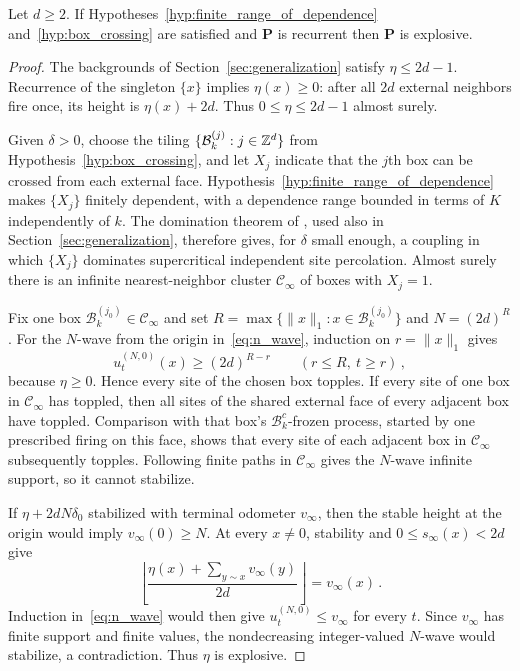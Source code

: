 \documentclass[12pt]{amsart}
\begin{document}
\begin{prop} \label{prop:explosion_criteria}
	Let $d\geq2$. If Hypotheses~\ref{hyp:finite_range_of_dependence} and~\ref{hyp:box_crossing} are satisfied and $\mathbf{P}$ is recurrent then $\mathbf{P}$ is explosive.
\end{prop}

\begin{proof}
The backgrounds of Section~\ref{sec:generalization} satisfy $\eta\leq 2d-1$.
Recurrence of the singleton $\{x\}$ implies $\eta(x)\geq0$: after all
$2d$ external neighbors fire once, its height is $\eta(x)+2d$.
Thus $0\leq\eta\leq2d-1$ almost surely.

Given $\delta>0$, choose the tiling $\{\mathcal B_k^{(j)}:j\in\mathbb{Z}^d\}$ from Hypothesis~\ref{hyp:box_crossing}, and let $X_j$ indicate that the $j$th box can be crossed from each external face. Hypothesis~\ref{hyp:finite_range_of_dependence} makes $\{X_j\}$ finitely dependent, with a dependence range bounded in terms of $K$ independently of $k$. The domination theorem of \cite{liggett1997domination}, used also in Section~\ref{sec:generalization}, therefore gives, for $\delta$ small enough, a coupling in which $\{X_j\}$ dominates supercritical independent site percolation. Almost surely there is an infinite nearest-neighbor cluster $\mathcal C_\infty$ of boxes with $X_j=1$.

Fix one box $\mathcal B_k^{(j_0)}\in\mathcal C_\infty$ and set $R=\max\{\|x\|_1:x\in\mathcal B_k^{(j_0)}\}$ and $N=(2d)^R$.
For the $N$-wave from the origin in~\eqref{eq:n_wave}, induction on $r=\|x\|_1$ gives
\begin{equation*}
u_t^{(N,0)}(x)\geq(2d)^{R-r}\qquad(r\leq R,\ t\geq r)\,,
\end{equation*}
because $\eta\geq0$. Hence every site of the chosen box topples.
If every site of one box in $\mathcal C_\infty$ has toppled, then all sites of the shared external face of every adjacent box have toppled. Comparison with that box's $\mathcal B_k^c$-frozen process, started by one prescribed firing on this face, shows that every site of each adjacent box in $\mathcal C_\infty$ subsequently topples. Following finite paths in $\mathcal C_\infty$ gives the $N$-wave infinite support, so it cannot stabilize.

If $\eta+2dN\delta_0$ stabilized with terminal odometer $v_\infty$, then the stable height at the origin would imply $v_\infty(0)\geq N$. At every $x\ne0$, stability and $0\leq s_\infty(x)<2d$ give
\begin{equation*}
\left\lfloor\frac{\eta(x)+\sum_{y\sim x}v_\infty(y)}{2d}\right\rfloor
=v_\infty(x)\,.
\end{equation*}
Induction in~\eqref{eq:n_wave} would then give $u_t^{(N,0)}\leq v_\infty$ for every $t$. Since $v_\infty$ has finite support and finite values, the nondecreasing integer-valued $N$-wave would stabilize, a contradiction. Thus $\eta$ is explosive.

\end{proof}
\end{document}
